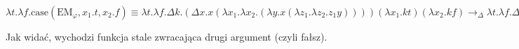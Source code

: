 \documentclass[11pt]{article}
\renewcommand{\phi}{\varphi}
\newcommand{\LEM}{\text{EM}_\phi}
\begin{document}
        \begin{center}
            $
            \lambda t. \lambda f. \text{case}(\LEM, x_1.t, x_2.f) \equiv
            \lambda t. \lambda f. \Delta k. (\Delta x. x(\lambda x_1. \lambda x_2. (\lambda y. x(\lambda z_1. \lambda z_2. z_1 y))))(\lambda x_1. kt)(\lambda x_2. kf)
            \to_\Delta
            \lambda t. \lambda f. \Delta k. (\Delta z. (\lambda w. z(w(\lambda x_1. kt)))(\lambda x_1. \lambda x_2. x_2(\lambda y. (\lambda w. z(w(\lambda x_1. kt)))(\lambda z_1. \lambda z_2. y))))(\lambda x_2. kf)
            \to_\beta
            \lambda t. \lambda f. \Delta k. (\Delta z. (\lambda w. z(w(\lambda x_1. kt)))(\lambda x_1. \lambda x_2. x_2(\lambda y. z(\lambda z_2. kt))))(\lambda x_2. kf)
            \to_\beta^*
            \lambda t. \lambda f. \Delta k. (\Delta z. z(\lambda x_2. x_2(\lambda y. z(\lambda z_2. kt))))(\lambda x_2. kf)
            \to_\Delta
            \lambda t. \lambda f. \Delta k. \Delta w. (\lambda a. w(a(\lambda x_2. kf)))(\lambda x_2. x_2(\lambda y. (\lambda a. w(a(\lambda x_2. kf)))(\lambda z_2. kt)))
            \to_\beta^*
            \lambda t. \lambda f. \Delta k. \Delta w. (\lambda a. w(a(\lambda x_2. kf)))(\lambda x_2. x_2(\lambda y. w(kt)))
            \to_\beta
            \lambda t. \lambda f. \Delta k. \Delta w. w((\lambda x_2. x_2(\lambda y. w(kt)))(\lambda x_2. kf))
            \to_\beta
            \lambda t. \lambda f. \Delta k. \Delta w. w((\lambda x_2. kf)(\lambda y. w(kt)))
            \to_\beta
            \lambda t. \lambda f. \Delta k. \Delta w. w(kf)
            \to_\Delta
            \lambda t. \lambda f. \Delta k. kf
            \to_\Delta
            \lambda t. \lambda f. f$
        \end{center}

    \par Jak widać, wychodzi funkcja stale zwracająca drugi argument (czyli fałsz).
\end{document}
